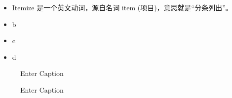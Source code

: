 \documentclass{ctexart}
\begin{document}
\begin{itemize} %
    \item Itemize 是一个英文动词，源自名词 item (项目)，意思就是“分条列出”。
    \item b
    \item c
    \item d
\end{itemize}


\begin{figure}[h] %
    \centering %
    \caption{Enter Caption}
    \label{fig:enter-label}
\end{figure}

\newpage

\begin{figure} [b] %
    \centering
    \caption{Enter Caption}
    \label{fig:enter-label-2}
\end{figure}



\begin{comment}
这是一个多行注释，你看我没用%
使用的包是 \usepackage{comment} 
\end{comment}

\end{document}
